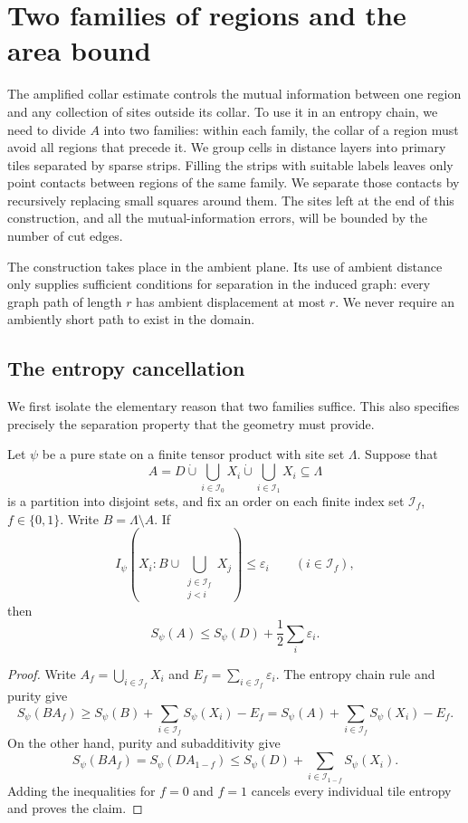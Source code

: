 \section{Two families of regions and the area bound}
\label{sec:geometry}

The amplified collar estimate controls the mutual information between one
region and any collection of sites outside its collar.  To use it in an
entropy chain, we need to divide $A$ into two families: within each family,
the collar of a region must avoid all regions that precede it.  We group
cells in distance layers into primary tiles separated by sparse strips.
Filling the strips with suitable labels leaves only point contacts between
regions of the same family.  We separate those contacts by recursively
replacing small squares around them.  The sites left at the end of this
construction, and all the mutual-information errors, will be bounded by
the number of cut edges.

The construction takes place in the ambient plane.  Its use of ambient
distance only supplies sufficient conditions for separation in the induced
graph: every graph path of length $r$ has ambient displacement at most $r$.
We never require an ambiently short path to exist in the domain.

\subsection{The entropy cancellation}

We first isolate the elementary reason that two families suffice.  This
also specifies precisely the separation property that the geometry must
provide.

\begin{lemma}
\label{geometry:cancellation}
Let $\psi$ be a pure state on a finite tensor product with site set
$\Lambda$.  Suppose that
\[
 A=D\mathbin{\dot\cup}\bigcup_{i\in\mathcal I_0}X_i
       \mathbin{\dot\cup}\bigcup_{i\in\mathcal I_1}X_i
 \subseteq\Lambda
\]
is a partition into disjoint sets, and fix an order on each finite index
set $\mathcal I_f$, $f\in\{0,1\}$.  Write $B=\Lambda\setminus A$.
If
\[
 I_\psi\left(X_i:B\cup
       \bigcup_{\substack{j\in\mathcal I_f\\j<i}}X_j\right)
 \le \varepsilon_i
 \qquad(i\in\mathcal I_f),
\]
then
\[
 S_\psi(A)\le S_\psi(D)+\frac12\sum_i\varepsilon_i.
\]
\end{lemma}

\begin{proof}
Write $A_f=\bigcup_{i\in\mathcal I_f}X_i$ and
$E_f=\sum_{i\in\mathcal I_f}\varepsilon_i$.  The entropy chain rule and
purity give
\[
 S_\psi(BA_f)
 \ge S_\psi(B)+\sum_{i\in\mathcal I_f}S_\psi(X_i)-E_f
 =S_\psi(A)+\sum_{i\in\mathcal I_f}S_\psi(X_i)-E_f.
\]
On the other hand, purity and subadditivity give
\[
 S_\psi(BA_f)=S_\psi(DA_{1-f})
 \le S_\psi(D)+\sum_{i\in\mathcal I_{1-f}}S_\psi(X_i).
\]
Adding the inequalities for $f=0$ and $f=1$ cancels every individual tile
entropy and proves the claim.
\end{proof}

